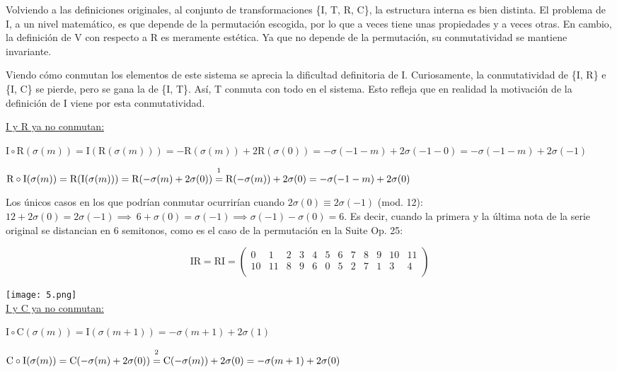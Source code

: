 		Volviendo a las definiciones originales, al conjunto de transformaciones \{I, T, R, C\}, la estructura interna es bien distinta. El problema de I, a un nivel matemático, es que depende de la permutación escogida, por lo que a veces tiene unas propiedades y a veces otras. En cambio, la definición de V con respecto a R es meramente estética. Ya que no depende de la permutación, su conmutatividad se mantiene invariante. 
		
		Viendo cómo conmutan los elementos de este sistema se aprecia la dificultad definitoria de I. Curiosamente, la conmutatividad de \{I, R\} e \{I, C\} se pierde, pero se gana la de \{I, T\}. Así, T conmuta con todo en el sistema. Esto refleja que en realidad la motivación de la definición de I viene por esta conmutatividad.
		
		\underline{I y R ya no conmutan:}
		
		$\text{I}\circ\text{R}(\sigma(m))=\text{I}(\text{R}(\sigma(m)))=-\text{R}(\sigma(m))+2\text{R}(\sigma(0))=-\sigma(-1-m)+2\sigma(-1-0)=-\sigma(-1-m)+2\sigma(-1)$
		
		$\text{R}\circ\text{I}(\sigma(m))=\text{R}(\text{I}(\sigma(m)))=\text{R}(-\sigma(m)+2\sigma(0))\overset{\footnote{R y T conmutan}}{=}\text{R}(-\sigma(m))+2\sigma(0)=-\sigma(-1-m)+2\sigma(0)$
		
		Los únicos casos en los que podrían conmutar ocurrirían cuando $2\sigma\left(0\right)\equiv2\sigma(-1)$ (mod. 12): $12+2\sigma\left(0\right)=2\sigma\left(-1\right)\implies\ 6+\sigma\left(0\right)=\sigma\left(-1\right)\implies \sigma\left(-1\right)-\sigma\left(0\right)=6$. Es decir, cuando la primera y la última nota de la serie original se distancian en 6 semitonos, como es el caso de la permutación en la Suite Op. 25:
		
		\[
		\text{IR}=\text{RI}=\left(\begin{matrix}0&1&2&3&4&5&6&7&8&9&10&11\\10&11&8&9&6&0&5&2&7&1&3&4\\\end{matrix}\right)
		\]	
		
		\texttt{[image: 5.png]}\\
		
		\underline{I y C ya no conmutan:}
		
		$\text{I}\circ\text{C}(\sigma(m))=\text{I}(\sigma(m+1))=-\sigma(m+1)+2\sigma(1)$
		
		$\text{C}\circ\text{I}(\sigma(m))=\text{C}(-\sigma(m)+2\sigma(0))\overset{\footnote{C y T conmutan}}{=}\text{C}(-\sigma(m))+2\sigma(0)=-\sigma(m+1)+2\sigma(0)$
		
